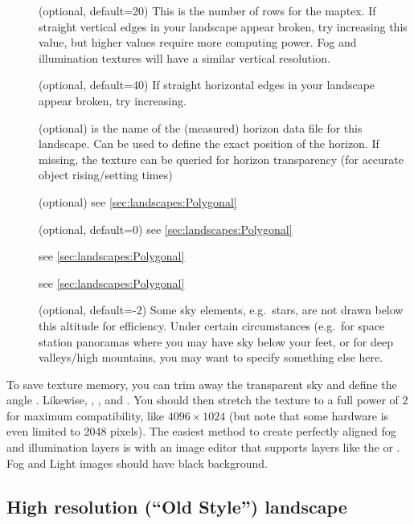 \begin{description}
\item[] (optional, default=20) This is the number
  of rows for the maptex. If straight vertical edges in your landscape
  appear broken, try increasing this value, but higher values require
  more computing power. Fog and illumination textures will have a
  similar vertical resolution.
\item[] (optional, default=40) If straight
  horizontal edges in your landscape appear broken, try increasing.
\item[] (optional) is the name of the
  (measured) horizon data file for this landscape. Can be used to
  define the exact position of the horizon. If missing, the texture
  can be queried for horizon transparency (for accurate object
  rising/setting times)
\item[] (optional) see \ref{sec:landscapes:Polygonal}
\item[] (optional, default=0) see \ref{sec:landscapes:Polygonal}
\item[] see \ref{sec:landscapes:Polygonal}
\item[]  see \ref{sec:landscapes:Polygonal}
\item[] (optional, default=-2)  Some sky
  elements, e.g.\ stars, are not drawn below this altitude for
  efficiency. Under certain circumstances (e.g.\ for space station
  panoramas where you may have sky below your feet, or for deep
  valleys/high mountains, you may want to specify something else
  here.
\end{description}
%
To save texture memory, %
you can trim away the transparent
sky and define the angle . Likewise,
, ,  and
. You should then stretch the texture to a
full power of 2 for maximum compatibility, like $4096\times1024$ (but note that some hardware is
even limited to 2048 pixels). The easiest method to create perfectly
aligned fog and illumination layers is with an image editor that
supports layers like the  or . Fog
and Light images should have black background.


\subsection{High resolution (``Old Style'')  landscape}
\label{sec:landscapes:oldStyle}

